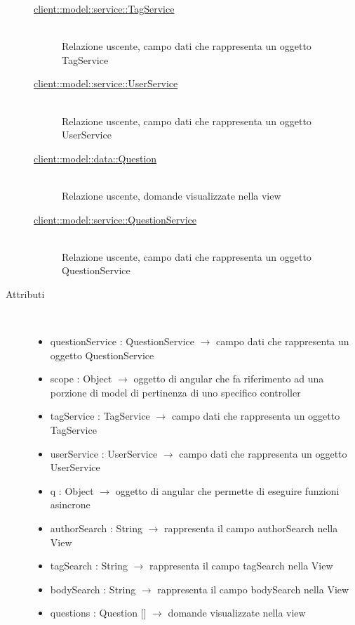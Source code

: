 \begin{description}
\begin{description}
	\item[\hyperlink{client::model::service::TagService}{client::model::service::TagService}] \hfill \\
	Relazione uscente, campo dati che rappresenta un oggetto TagService
	\item[\hyperlink{client::model::service::UserService}{client::model::service::UserService}] \hfill \\
	Relazione uscente, campo dati che rappresenta un oggetto UserService
	\item[\hyperlink{client::model::data::Question}{client::model::data::Question}] \hfill \\
	Relazione uscente, domande visualizzate nella view
	\item[\hyperlink{client::model::service::QuestionService}{client::model::service::QuestionService}] \hfill \\
	Relazione uscente, campo dati che rappresenta un oggetto QuestionService
\end{description}

\item[Attributi] \hfill \\
\vspace{-7mm}
\begin{itemize}
	\item questionService : QuestionService $\rightarrow$ campo dati che rappresenta un oggetto QuestionService
	\item scope : Object $\rightarrow$ oggetto di angular che fa riferimento ad una porzione di model di pertinenza di uno specifico controller
	\item tagService : TagService $\rightarrow$ campo dati che rappresenta un oggetto TagService
	\item userService : UserService $\rightarrow$ campo dati che rappresenta un oggetto UserService
	\item q : Object $\rightarrow$ oggetto di angular che permette di eseguire funzioni asincrone
	\item authorSearch : String $\rightarrow$ rappresenta il campo authorSearch nella View
	\item tagSearch : String $\rightarrow$ rappresenta il campo tagSearch nella View
	\item bodySearch : String $\rightarrow$ rappresenta il campo bodySearch nella View
	\item questions : Question [] $\rightarrow$ domande visualizzate nella view
\end{itemize}


\end{description}
